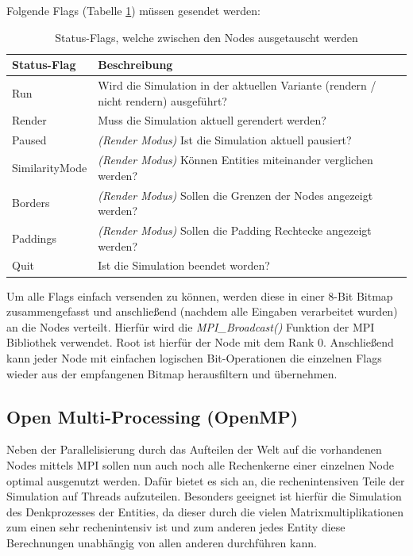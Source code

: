 \documentclass[course=erap]{aspdoc}
\begin{document}
Folgende Flags (Tabelle \ref{table:status-flags}) müssen gesendet werden:

\begin{table}[H]
\begin{center}
\begin{tabular}{| l | p{10cm} |}
\hline
Status-Flag & Beschreibung \\
\hline
\hline
Run &
Wird die Simulation in der aktuellen Variante (rendern / nicht rendern) ausgeführt? \\
\hline
Render &
Muss die Simulation aktuell gerendert werden? \\
\hline
Paused &
\textsl{(Render Modus)} Ist die Simulation aktuell pausiert?\\
\hline
SimilarityMode &
\textsl{(Render Modus)} Können Entities miteinander verglichen werden? \\
\hline
Borders &
\textsl{(Render Modus)} Sollen die Grenzen der Nodes angezeigt werden? \\
\hline
Paddings &
\textsl{(Render Modus)} Sollen die Padding Rechtecke angezeigt werden?\\
\hline
Quit &
Ist die Simulation beendet worden? \\
\hline
\end{tabular}
\caption{Status-Flags, welche zwischen den Nodes ausgetauscht werden}
\label{table:status-flags}
\end{center}
\end{table}

Um alle Flags einfach versenden zu können, werden diese in einer 8-Bit Bitmap zusammengefasst und anschließend (nachdem alle Eingaben verarbeitet wurden) an die Nodes verteilt. Hierfür wird die \emph{MPI\_Broadcast()} Funktion der MPI Bibliothek verwendet. Root ist hierfür der Node mit dem Rank 0. Anschließend kann jeder Node mit einfachen logischen Bit-Operationen die einzelnen Flags wieder aus der empfangenen Bitmap herausfiltern und übernehmen.

\subsection{Open Multi-Processing (OpenMP)}
Neben der Parallelisierung durch das Aufteilen der Welt auf die vorhandenen Nodes mittels MPI sollen nun auch noch alle Rechenkerne einer einzelnen Node optimal ausgenutzt werden. Dafür bietet es sich an, die rechenintensiven Teile der Simulation auf Threads aufzuteilen. Besonders geeignet ist hierfür die Simulation des Denkprozesses der Entities, da dieser durch die vielen Matrixmultiplikationen zum einen sehr rechenintensiv ist und zum anderen jedes Entity diese Berechnungen unabhängig von allen anderen durchführen kann.
\end{document}

